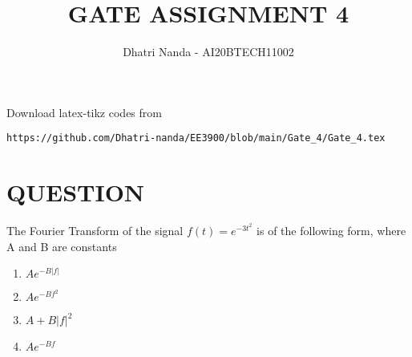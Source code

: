\documentclass[journal,12pt,twocolumn]{IEEEtran}
\begin{document}
\let\vec\mathbf
\renewcommand{\thefigure}{\theproblem}
\def\putbox#1#2#3{\makebox[0in][l]{\makebox[#1][l]{}\raisebox{\baselineskip}[0in][0in]{\raisebox{#2}[0in][0in]{#3}}}}
     \def\rightbox#1{\makebox[0in][r]{#1}}
     \def\centbox#1{\makebox[0in]{#1}}
     \def\topbox#1{\raisebox{-\baselineskip}[0in][0in]{#1}}
     \def\midbox#1{\raisebox{-0.5\baselineskip}[0in][0in]{#1}}
\vspace{3cm}
\title{\textbf{ GATE ASSIGNMENT 4}}
\author{Dhatri Nanda - AI20BTECH11002}
\maketitle
\newpage
\bigskip
\renewcommand{\thefigure}{\arabic{figure}}
\renewcommand{\thetable}{\arabic{table}}
Download latex-tikz codes from 
%
\begin{lstlisting}
https://github.com/Dhatri-nanda/EE3900/blob/main/Gate_4/Gate_4.tex
\end{lstlisting}
\section*{QUESTION}
The Fourier Transform of the signal $f(t) = e^{-3t^2}$ is of the following form, where A and B are constants

\begin{enumerate}[label={\Alph*)}]
\item $Ae^{-B|f|}$\\
\item $Ae^{-Bf^2}$\\
\item $A + B|f|^2$\\
\item $Ae^{-Bf}$\\
\end{enumerate}
\end{document}
